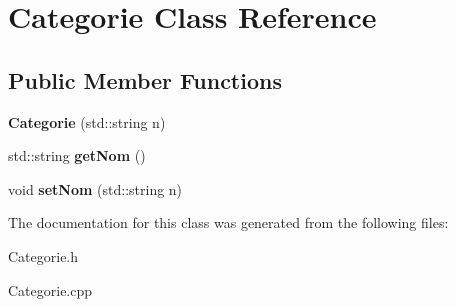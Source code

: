 \section{Categorie Class Reference}
\label{class_categorie}
\subsection*{Public Member Functions}
\begin{DoxyCompactItemize}
\item 
{\bfseries Categorie} (std\-::string n)\label{class_categorie_ab7ef54581c3480eaa164f694eb934363}

\item 
std\-::string {\bfseries get\-Nom} ()\label{class_categorie_af6bde3e082e8bf1991616ef7021326d7}

\item 
void {\bfseries set\-Nom} (std\-::string n)\label{class_categorie_ad73a8841ac056863263d544c48ba7e29}

\end{DoxyCompactItemize}


The documentation for this class was generated from the following files\-:\begin{DoxyCompactItemize}
\item 
Categorie.\-h\item 
Categorie.\-cpp\end{DoxyCompactItemize}
